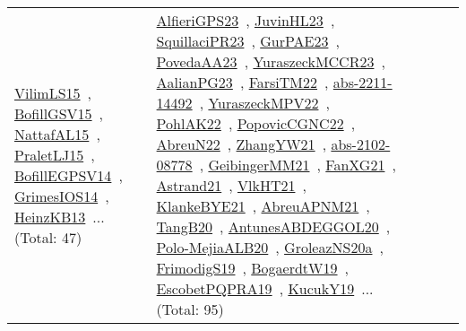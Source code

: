 {\begin{longtable}{lp{3cm}>{\raggedright\arraybackslash}p{6cm}>{\raggedright\arraybackslash}p{6cm}>{\raggedright\arraybackslash}p{8cm}}
\href{works/VilimLS15.pdf}{VilimLS15}~\cite{VilimLS15}, \href{works/BofillGSV15.pdf}{BofillGSV15}~\cite{BofillGSV15}, \href{works/NattafAL15.pdf}{NattafAL15}~\cite{NattafAL15}, \href{works/PraletLJ15.pdf}{PraletLJ15}~\cite{PraletLJ15}, \href{works/BofillEGPSV14.pdf}{BofillEGPSV14}~\cite{BofillEGPSV14}, \href{works/GrimesIOS14.pdf}{GrimesIOS14}~\cite{GrimesIOS14}, \href{works/HeinzKB13.pdf}{HeinzKB13}~\cite{HeinzKB13}... (Total: 47) & \href{works/AlfieriGPS23.pdf}{AlfieriGPS23}~\cite{AlfieriGPS23}, \href{works/JuvinHL23.pdf}{JuvinHL23}~\cite{JuvinHL23}, \href{works/SquillaciPR23.pdf}{SquillaciPR23}~\cite{SquillaciPR23}, \href{works/GurPAE23.pdf}{GurPAE23}~\cite{GurPAE23}, \href{works/PovedaAA23.pdf}{PovedaAA23}~\cite{PovedaAA23}, \href{works/YuraszeckMCCR23.pdf}{YuraszeckMCCR23}~\cite{YuraszeckMCCR23}, \href{works/AalianPG23.pdf}{AalianPG23}~\cite{AalianPG23}, \href{works/FarsiTM22.pdf}{FarsiTM22}~\cite{FarsiTM22}, \href{works/abs-2211-14492.pdf}{abs-2211-14492}~\cite{abs-2211-14492}, \href{works/YuraszeckMPV22.pdf}{YuraszeckMPV22}~\cite{YuraszeckMPV22}, \href{works/PohlAK22.pdf}{PohlAK22}~\cite{PohlAK22}, \href{works/PopovicCGNC22.pdf}{PopovicCGNC22}~\cite{PopovicCGNC22}, \href{works/AbreuN22.pdf}{AbreuN22}~\cite{AbreuN22}, \href{works/ZhangYW21.pdf}{ZhangYW21}~\cite{ZhangYW21}, \href{works/abs-2102-08778.pdf}{abs-2102-08778}~\cite{abs-2102-08778}, \href{works/GeibingerMM21.pdf}{GeibingerMM21}~\cite{GeibingerMM21}, \href{works/FanXG21.pdf}{FanXG21}~\cite{FanXG21}, \href{works/Astrand21.pdf}{Astrand21}~\cite{Astrand21}, \href{works/VlkHT21.pdf}{VlkHT21}~\cite{VlkHT21}, \href{works/KlankeBYE21.pdf}{KlankeBYE21}~\cite{KlankeBYE21}, \href{works/AbreuAPNM21.pdf}{AbreuAPNM21}~\cite{AbreuAPNM21}, \href{works/TangB20.pdf}{TangB20}~\cite{TangB20}, \href{works/AntunesABDEGGOL20.pdf}{AntunesABDEGGOL20}~\cite{AntunesABDEGGOL20}, \href{works/Polo-MejiaALB20.pdf}{Polo-MejiaALB20}~\cite{Polo-MejiaALB20}, \href{works/GroleazNS20a.pdf}{GroleazNS20a}~\cite{GroleazNS20a}, \href{works/FrimodigS19.pdf}{FrimodigS19}~\cite{FrimodigS19}, \href{works/BogaerdtW19.pdf}{BogaerdtW19}~\cite{BogaerdtW19}, \href{works/EscobetPQPRA19.pdf}{EscobetPQPRA19}~\cite{EscobetPQPRA19}, \href{works/KucukY19.pdf}{KucukY19}~\cite{KucukY19}... (Total: 95)\\

\end{longtable}}
